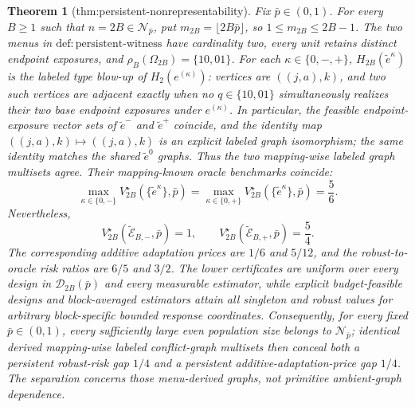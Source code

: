 \documentclass{article}
\newtheorem{theorem}{Theorem}
\begin{document}
\begin{theorem}[thm:persistent-nonrepresentability]\label{thm:persistent-nonrepresentability}
Fix \(\bar p\in(0,1)\). For every \(B\ge1\) such that \(n=2B\in\mathcal N_{\bar p}\), put \(m_{2B}=\lfloor2B\bar p\rfloor\), so \(1\le m_{2B}\le2B-1\). The two menus in \(\mathrm{def{:}persistent\text{-}witness}\) have cardinality two, every unit retains distinct endpoint exposures, and \(\rho_B(\Omega_{2B})=\{10,01\}\). For each \(\kappa\in\{0,-,+\}\), \(H_{2B}(\widetilde e^\kappa)\) is the labeled type blow-up of \(H_2(e^{(\kappa)})\): vertices are \(((j,a),k)\), and two such vertices are adjacent exactly when no \(q\in\{10,01\}\) simultaneously realizes their two base endpoint exposures under \(e^{(\kappa)}\). In particular, the feasible endpoint-exposure vector sets of \(\widetilde e^-\) and \(\widetilde e^+\) coincide, and the identity map \(((j,a),k)\mapsto((j,a),k)\) is an explicit labeled graph isomorphism; the same identity matches the shared \(\widetilde e^0\) graphs. Thus the two mapping-wise labeled graph multisets agree. Their mapping-known oracle benchmarks coincide:
\[
 \max_{\kappa\in\{0,-\}}V_{2B}^\star(\{\widetilde e^\kappa\},\bar p)
 =\max_{\kappa\in\{0,+\}}V_{2B}^\star(\{\widetilde e^\kappa\},\bar p)
 =\frac56.
\]
Nevertheless,
\[
 V_{2B}^\star(\widetilde{\mathcal E}_{B,-},\bar p)=1,
 \qquad
 V_{2B}^\star(\widetilde{\mathcal E}_{B,+},\bar p)=\frac54.
\]
The corresponding additive adaptation prices are \(1/6\) and \(5/12\), and the robust-to-oracle risk ratios are \(6/5\) and \(3/2\). The lower certificates are uniform over every design in \(\mathcal D_{2B}(\bar p)\) and every measurable estimator, while explicit budget-feasible designs and block-averaged estimators attain all singleton and robust values for arbitrary block-specific bounded response coordinates. Consequently, for every fixed \(\bar p\in(0,1)\), every sufficiently large even population size belongs to \(\mathcal N_{\bar p}\); identical derived mapping-wise labeled conflict-graph multisets then conceal both a persistent robust-risk gap \(1/4\) and a persistent additive-adaptation-price gap \(1/4\). The separation concerns those menu-derived graphs, not primitive ambient-graph dependence.
\end{theorem}
\end{document}

